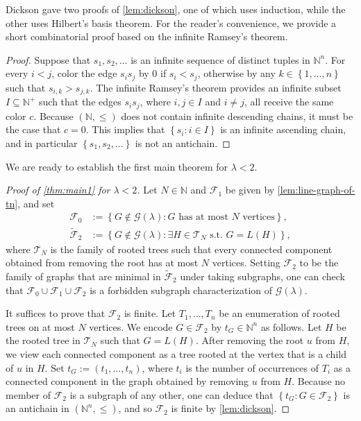 \documentclass[11pt]{article}
\theoremstyle{definition}
\theoremstyle{remark}
\newcommand{\dset}[2]{\left\{{#1}\colon{#2}\right\}}
\newcommand{\sset}[1]{\left\{{#1}\right\}}
\newcommand{\la}{\lambda}
\newcommand{\F}{\mathcal{F}}
\newcommand{\G}{\mathcal{G}}
\newcommand{\N}{\mathbb{N}}
\newcommand{\Gl}{\G(\la)}
\begin{document}
Dickson gave two proofs of \cref{lem:dickson}, one of which uses induction, while the other uses Hilbert's basis theorem. For the reader's convenience, we provide a short combinatorial proof based on the infinite Ramsey's theorem.

\begin{proof}
    Suppose that $s_1, s_2, \dots$ is an infinite sequence of distinct tuples in $\N^n$. For every $i < j$, color the edge $s_i s_j$ by $0$ if $s_i < s_j$, otherwise by any $k \in \sset{1, \dots, n}$ such that $s_{i,k} > s_{j,k}$. The infinite Ramsey's theorem provides an infinite subset $I \subseteq \N^+$ such that the edges $s_i s_j$, where $i, j \in I$ and $i\neq j$, all receive the same color $c$. Because $(\N, \le)$ does not contain infinite descending chains, it must be the case that $c = 0$. This implies that $\dset{s_i}{i \in I}$ is an infinite ascending chain, and in particular $\sset{s_1, s_2, \dots}$ is not an antichain.
\end{proof}

We are ready to establish the first main theorem for $\la < 2$.

\begin{proof}[Proof of \cref{thm:main1} for $\la < 2$]
    Let $N \in \N$ and $\F_1$ be given by \cref{lem:line-graph-of-tn}, and set
    \begin{align*}
        \F_0 & := \dset{G \not\in \Gl}{G \text{ has at most }N \text{ vertices}}, \\
        \widetilde{\F}_2 & := \dset{G \not\in \Gl}{\exists H \in \mathcal{T}_N \text{ s.t.\ }G = L(H)},
    \end{align*}
    where $\mathcal{T}_N$ is the family of rooted trees such that every connected component obtained from removing the root has at most $N$ vertices. Setting $\F_2$ to be the family of graphs that are minimal in $\widetilde{\F}_2$ under taking subgraphs, one can check that $\F_0 \cup \F_1 \cup \F_2$ is a forbidden subgraph characterization of $\Gl$.

    It suffices to prove that $\F_2$ is finite. Let $T_1, \dots, T_n$ be an enumeration of rooted trees on at most $N$ vertices. We encode $G \in \F_2$ by $t_G \in \N^n$ as follows. Let $H$ be the rooted tree in $\mathcal{T}_N$ such that $G = L(H)$. After removing the root $u$ from $H$, we view each connected component as a tree rooted at the vertex that is a child of $u$ in $H$. Set $t_G := (t_1, \dots, t_n)$, where $t_i$ is the number of occurrences of $T_i$ as a connected component in the graph obtained by removing $u$ from $H$. Because no member of $\F_2$ is a subgraph of any other, one can deduce that $\dset{t_G}{G \in \F_2}$ is an antichain in $(\N^n, \le)$, and so $\F_2$ is finite by \cref{lem:dickson}.
\end{proof}
\end{document}
